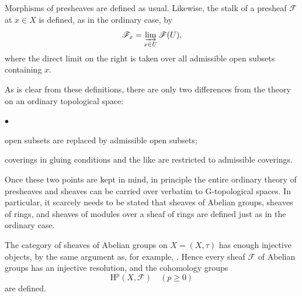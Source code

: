 \documentclass[a4paper,12pt, dvipdfmx]{jsbook}
\def\H{\mathrm{H}}
\renewenvironment{itemize}%
{%
   \begin{list}{\parbox{1zw}{$\bullet$}}%
   {%
      \setlength{\topsep}{.5zh}
      \setlength{\itemindent}{0zw}
      \setlength{\leftmargin}{3zw}%
      \setlength{\rightmargin}{0zw}%
      \setlength{\labelsep}{.5zw}%
      \setlength{\labelwidth}{3zw}%
      \setlength{\itemsep}{0.2em}%
      \setlength{\parsep}{0em}%
      \setlength{\listparindent}{0zw}%
   }
}{%
   \end{list}%
}
\theoremstyle{plain}
\theoremstyle{definition}
\begin{document}
Morphisms of presheaves are defined as usual.
Likewise, the stalk of a presheaf $\mathscr{F}$ at $x\in X$ is defined, as in the ordinary case, by
$$
\mathscr{F}_x=\varinjlim_{x\in U}\mathscr{F}(U),
$$
where the direct limit on the right is taken over all admissible open subsets containing $x$.

As is clear from these definitions, there are only two differences from the theory on an ordinary topological space:
\begin{itemize}
\item open subsets are replaced by admissible open subsets;
\item coverings in gluing conditions and the like are restricted to admissible coverings.
\end{itemize}
Once these two points are kept in mind, in principle the entire ordinary theory of presheaves and sheaves can be carried over verbatim to G-topological spaces.
In particular, it scarcely needs to be stated that sheaves of Abelian groups, sheaves of rings, and sheaves of modules over a sheaf of rings are defined just as in the ordinary case.

The category of sheaves of Abelian groups on $X=(X,\tau)$ has enough injective objects, by the same argument as, for example, \cite[Chap.\ II, Theorem 3.1]{Iversen}.
Hence every sheaf $\mathscr{F}$ of Abelian groups has an injective resolution, and the cohomology groups
$$
\H^p(X,\mathscr{F})\quad (p\geq 0)
$$
are defined.
\end{document}
